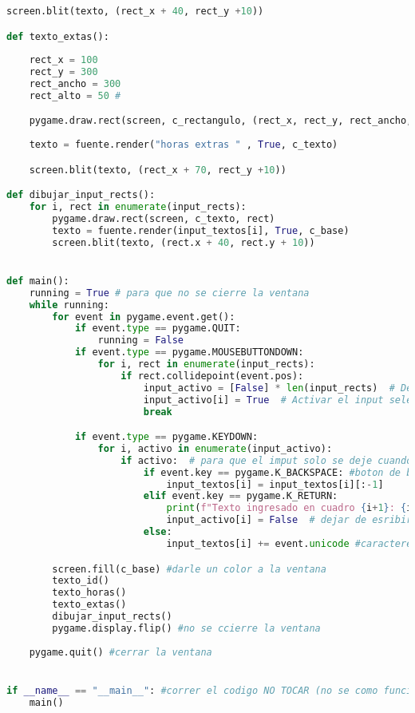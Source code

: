 \documentclass[a4paper,12pt]{article}
\begin{document}
\begin{itemize}
\begin{lstlisting}[language=python]
    screen.blit(texto, (rect_x + 40, rect_y +10)) 

def texto_extas():
    
    rect_x = 100 
    rect_y = 300 
    rect_ancho = 300 
    rect_alto = 50 #

    pygame.draw.rect(screen, c_rectangulo, (rect_x, rect_y, rect_ancho, rect_alto)) 
    
    texto = fuente.render("horas extras " , True, c_texto) 

    screen.blit(texto, (rect_x + 70, rect_y +10))

def dibujar_input_rects():
    for i, rect in enumerate(input_rects):
        pygame.draw.rect(screen, c_texto, rect)
        texto = fuente.render(input_textos[i], True, c_base)
        screen.blit(texto, (rect.x + 40, rect.y + 10))


def main():
    running = True # para que no se cierre la ventana
    while running:
        for event in pygame.event.get():
            if event.type == pygame.QUIT:
                running = False
            if event.type == pygame.MOUSEBUTTONDOWN:
                for i, rect in enumerate(input_rects):
                    if rect.collidepoint(event.pos):
                        input_activo = [False] * len(input_rects)  # Desactivar todo xd
                        input_activo[i] = True  # Activar el input seleccionado
                        break

            if event.type == pygame.KEYDOWN:
                for i, activo in enumerate(input_activo):
                    if activo:  # para que el imput solo se deje cuando uno le de click
                        if event.key == pygame.K_BACKSPACE: #boton de borado sirve graias a dios
                            input_textos[i] = input_textos[i][:-1]
                        elif event.key == pygame.K_RETURN:
                            print(f"Texto ingresado en cuadro {i+1}: {input_textos[i]}") # prueba por que no confio en mi mismo
                            input_activo[i] = False  # dejar de esribir cunado se le de ente al escribri
                        else:
                            input_textos[i] += event.unicode #caracteres especiales

        screen.fill(c_base) #darle un color a la ventana
        texto_id()
        texto_horas()
        texto_extas()
        dibujar_input_rects()
        pygame.display.flip() #no se ccierre la ventana
        
    pygame.quit() #cerrar la ventana


if __name__ == "__main__": #correr el codigo NO TOCAR (no se como funciona)
    main()
    \end{lstlisting}
\end{itemize}
\end{document}
